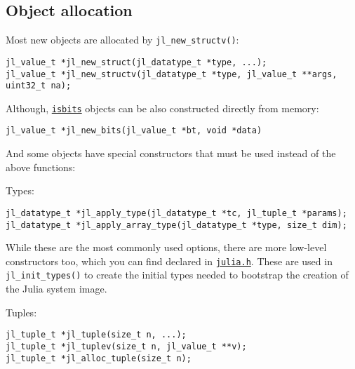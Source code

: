 \hypertarget{14420252243983980472}{}


\subsection{Object allocation}



Most new objects are allocated by \texttt{jl\_new\_structv()}:




\begin{lstlisting}
jl_value_t *jl_new_struct(jl_datatype_t *type, ...);
jl_value_t *jl_new_structv(jl_datatype_t *type, jl_value_t **args, uint32_t na);
\end{lstlisting}



Although, \hyperlink{12980593021531333073}{\texttt{isbits}} objects can be also constructed directly from memory:




\begin{lstlisting}
jl_value_t *jl_new_bits(jl_value_t *bt, void *data)
\end{lstlisting}



And some objects have special constructors that must be used instead of the above functions:



Types:




\begin{lstlisting}
jl_datatype_t *jl_apply_type(jl_datatype_t *tc, jl_tuple_t *params);
jl_datatype_t *jl_apply_array_type(jl_datatype_t *type, size_t dim);
\end{lstlisting}



While these are the most commonly used options, there are more low-level constructors too, which you can find declared in \href{https://github.com/JuliaLang/julia/blob/master/src/julia.h}{\texttt{julia.h}}. These are used in \texttt{jl\_init\_types()} to create the initial types needed to bootstrap the creation of the Julia system image.



Tuples:




\begin{lstlisting}
jl_tuple_t *jl_tuple(size_t n, ...);
jl_tuple_t *jl_tuplev(size_t n, jl_value_t **v);
jl_tuple_t *jl_alloc_tuple(size_t n);
\end{lstlisting}



